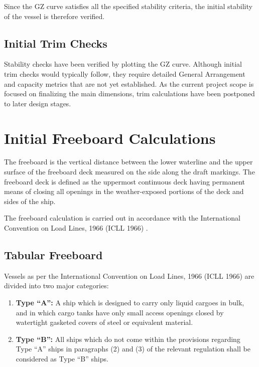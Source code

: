 \documentclass[12pt,a4paper,twoside]{report}
\begin{document}
\vspace{\baselineskip} \par \noindent Since the GZ curve satisfies all the specified stability criteria, the
initial stability of the vessel is therefore verified.

\subsection{Initial Trim Checks}

Stability checks have been verified by plotting the GZ
curve. Although initial trim checks would typically follow, they require
detailed General Arrangement and capacity metrics that are not yet
established. As the current project scope is focused on finalizing the
main dimensions, trim calculations have been postponed to later
design stages.
\section{Initial Freeboard Calculations}

The freeboard is the vertical distance between the lower waterline and
the upper surface of the freeboard deck measured on the side along
the draft markings. The freeboard deck is defined as the uppermost
continuous deck having permanent means of closing all openings in
the weather-exposed portions of the deck and sides of the ship.

\vspace{\baselineskip} \par \noindent The freeboard calculation is carried out in accordance with the
International Convention on Load Lines, 1966 (ICLL 1966)
\cite{international_load_lines_1966}.
\subsection{Tabular Freeboard}

Vessels as per the International Convention on Load Lines, 1966
(ICLL 1966) are divided into two major categories:

\begin{enumerate}[\alph*)]
    \item \textbf{Type ``A'':} A ship which is designed to carry only
    liquid cargoes in bulk, and in which cargo tanks have only small
    access openings closed by watertight gasketed covers of steel or
    equivalent material.

    \item \textbf{Type ``B'':} All ships which do not come within the
    provisions regarding Type ``A'' ships in paragraphs (2) and (3)
    of the relevant regulation shall be considered as Type ``B'' ships.
\end{enumerate}
\end{document}

